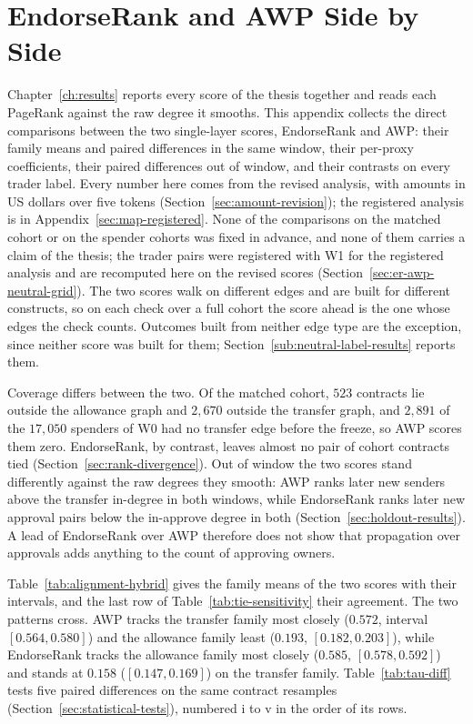 \section{EndorseRank and AWP Side by Side}
\label{ch:appendix-er-awp}

Chapter~\ref{ch:results} reports every score of the thesis together and reads each PageRank against the raw degree it smooths. This appendix collects the direct comparisons between the two single-layer scores, EndorseRank and AWP: their family means and paired differences in the same window, their per-proxy coefficients, their paired differences out of window, and their contrasts on every trader label. Every number here comes from the revised analysis, with amounts in US dollars over five tokens (Section~\ref{sec:amount-revision}); the registered analysis is in Appendix~\ref{sec:map-registered}. None of the comparisons on the matched cohort or on the spender cohorts was fixed in advance, and none of them carries a claim of the thesis; the trader pairs were registered with W1 for the registered analysis and are recomputed here on the revised scores (Section~\ref{sec:er-awp-neutral-grid}). The two scores walk on different edges and are built for different constructs, so on each check over a full cohort the score ahead is the one whose edges the check counts. Outcomes built from neither edge type are the exception, since neither score was built for them; Section~\ref{sub:neutral-label-results} reports them.

Coverage differs between the two. Of the matched cohort, $523$ contracts lie outside the allowance graph and $2{,}670$ outside the transfer graph, and $2{,}891$ of the $17{,}050$ spenders of W0 had no transfer edge before the freeze, so AWP scores them zero. EndorseRank, by contrast, leaves almost no pair of cohort contracts tied (Section~\ref{sec:rank-divergence}). Out of window the two scores stand differently against the raw degrees they smooth: AWP ranks later new senders above the transfer in-degree in both windows, while EndorseRank ranks later new approval pairs below the in-approve degree in both (Section~\ref{sec:holdout-results}). A lead of EndorseRank over AWP therefore does not show that propagation over approvals adds anything to the count of approving owners.


Table~\ref{tab:alignment-hybrid} gives the family means of the two scores with their intervals, and the last row of Table~\ref{tab:tie-sensitivity} their agreement. The two patterns cross. AWP tracks the transfer family most closely ($0.572$, interval $[0.564,0.580]$) and the allowance family least ($0.193$, $[0.182,0.203]$), while EndorseRank tracks the allowance family most closely ($0.585$, $[0.578,0.592]$) and stands at $0.158$ ($[0.147,0.169]$) on the transfer family. Table~\ref{tab:tau-diff} tests five paired differences on the same contract resamples (Section~\ref{sec:statistical-tests}), numbered i to v in the order of its rows.

